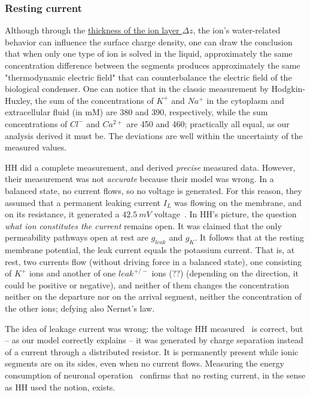 \subsubsection{Resting current\label{sec:Single-RestingCurrent}}
Although through the \hyperlink{PhysicalIonLayerThickness}{thickness of the ion layer $\Delta z$}, the ion's water-related behavior can influence the surface charge density,
one can draw the conclusion that when only one type of ion is solved in the liquid, approximately the same
concentration difference between the segments produces approximately 
the same "thermodynamic electric field" that can counterbalance the 
electric field of the biological condenser. One can notice that in the classic measurement by Hodgkin-Huxley, the sum of the concentrations of $K^+$ and $Na^+$ in the cytoplasm and extracellular fluid  (in mM) are 380 and 390, respectively, while the sum concentrations of $Cl^-$ and $Ca^{2+}$
are 450 and 460; practically all equal, as our analysis derived it must be. The deviations are well within the uncertainty of the 
measured values.  


\gls{HH} did a complete measurement, and derived \textit{precise} 
measured data. However, their measurement was not \textit{accurate} because 
their model was wrong.
In a balanced state, no 
current flows, so no voltage is generated.
For this reason, they assumed that a permanent leaking current $I_L$
was flowing on the membrane, and on its resistance, it generated
a $42.5\ mV$ voltage~\cite{CompanionGuideHodgkinHuxley:2022}.
In \gls{HH}'s picture,
the question \textit{what ion constitutes the current} remains open. 
It was claimed that the only permeability pathways open at rest are $g_{leak}$ and $g_K$. It follows that at the resting membrane potential, the leak current equals the potassium current. That is, at rest, two currents flow (without driving force in a balanced state), one consisting of $K^+$ ions and another of one $leak^{+/-}$ ions (??) (depending on the direction, it could be positive or negative),
and neither of them changes the concentration neither on the departure nor on the arrival segment, neither the concentration of the other ions; defying also Nernst's law.

The idea of leakage current was wrong: the voltage 
\gls{HH} measured~\cite{CompanionGuideHodgkinHuxley:2022}  is correct, but
-- as our model correctly explains -- it was generated by charge separation instead of a current through a distributed resistor.
It is permanently present while ionic segments are on its sides, even  when no current flows. Measuring the energy consumption of neuronal operation~\cite{EnergyNeuralCommunication:2021} confirms that no resting current,
in the sense as \gls{HH} used the notion, exists.




